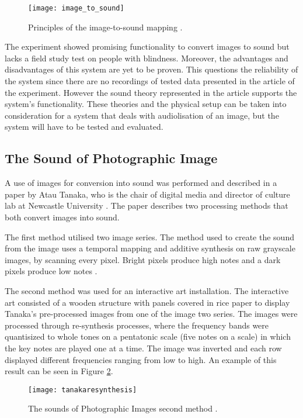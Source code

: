 \begin{figure}[!h] 
\centering
\texttt{[image: image\_to\_sound]}
\caption{\label{fig:image_to_sound} Principles of the image-to-sound mapping \cite{Meijer1992}.}
\end{figure}
  
The experiment showed promising functionality to convert images to sound but lacks a field study test on people with blindness. Moreover, the advantages and disadvantages of this system are yet to be proven. This questions the reliability of the system since there are no recordings of tested data presented in the article of the experiment. However the sound theory represented in the article supports the system's functionality. These theories and the physical setup can be taken into consideration for a system that deals with audiolisation of an image, but the system will have to be tested and evaluated.

\subsection{The Sound of Photographic Image}\label{sec:soundarticle}
A use of images for conversion into sound was performed and described in a paper by Atau Tanaka, who is the chair of digital media and director of culture lab at Newcastle University \cite{Tanaka2012}. The paper describes two processing methods that both convert images into sound.

The first method utilised two image series. The method used to create the sound from the image uses a temporal mapping and additive synthesis on raw grayscale images, by scanning every pixel. Bright pixels produce high notes and a dark pixels produce low notes \cite{Tanaka2012}.

The second method was used for an interactive art installation. The interactive art consisted of a wooden structure with panels covered in rice paper to display Tanaka's pre-processed images from one of the image two series. The images were processed through re-synthesis processes, where the frequency bands were quantisized to whole tones on a pentatonic scale (five notes on a scale) in which the key notes are played one at a time. The image was inverted and each row displayed different frequencies ranging from low to high. An example of this result can be seen in Figure \ref{fig:tanakaresynthesis}. 

\begin{figure}[!h]
\centering
\texttt{[image: tanakaresynthesis]}
\caption{\label{fig:tanakaresynthesis}The sounds of Photographic Images second method \cite{Tanaka2012}.}
\end{figure}

